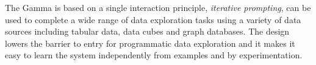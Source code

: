 \documentclass[manuscript,review,anonymous]{acmart}
\begin{document}
The Gamma is based on a single interaction principle, \emph{iterative prompting}, can be used to
complete a wide range of data exploration tasks using a variety of data sources including tabular
data, data cubes and graph databases. The design lowers the barrier to entry for programmatic
data exploration and it makes it easy to learn the system independently from examples and by
experimentation.


\balance{}



\end{document}
